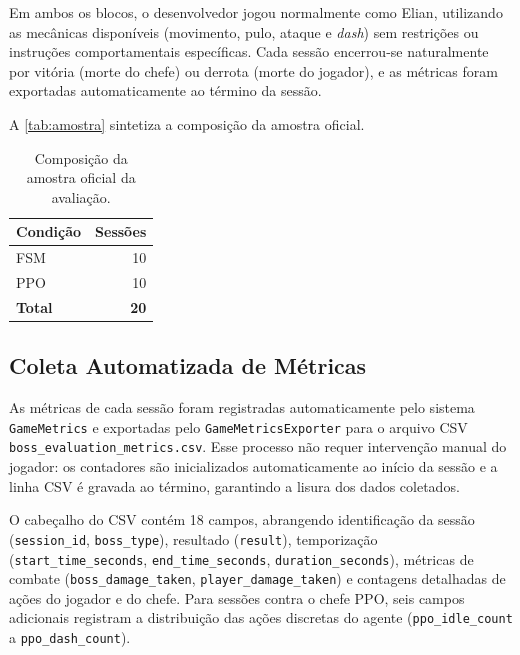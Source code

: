 Em ambos os blocos, o desenvolvedor jogou normalmente como Elian, utilizando
as mecânicas disponíveis (movimento, pulo, ataque e \textit{dash}) sem
restrições ou instruções comportamentais específicas. Cada sessão encerrou-se
naturalmente por vitória (morte do chefe) ou derrota (morte do jogador), e
as métricas foram exportadas automaticamente ao término da sessão.

A \autoref{tab:amostra} sintetiza a composição da amostra oficial.

\begin{table}[htb]
    \centering
    \caption{Composição da amostra oficial da avaliação.}
    \label{tab:amostra}
    \begin{tabular}{l r}
        \toprule
        \textbf{Condição} & \textbf{Sessões} \\
        \midrule
        FSM                & 10 \\
        PPO                & 10 \\
        \midrule
        \textbf{Total}     & \textbf{20} \\
        \bottomrule
    \end{tabular}
\end{table}

\subsection{Coleta Automatizada de Métricas}
\label{subsec:coleta-automatizada}

As métricas de cada sessão foram registradas automaticamente pelo sistema
\texttt{GameMetrics} e exportadas pelo \texttt{GameMetricsExporter} para o
arquivo CSV \texttt{boss\_evaluation\_metrics.csv}. Esse processo não requer
intervenção manual do jogador: os contadores são inicializados
automaticamente ao início da sessão e a linha CSV é gravada ao término,
garantindo a lisura dos dados coletados.

O cabeçalho do CSV contém 18 campos, abrangendo identificação da sessão
(\texttt{session\_id}, \texttt{boss\_type}), resultado
(\texttt{result}), temporização (\texttt{start\_time\_seconds},
\texttt{end\_time\_seconds}, \texttt{duration\_seconds}), métricas de
combate (\texttt{boss\_damage\_taken}, \texttt{player\_damage\_taken}) e
contagens detalhadas de ações do jogador e do chefe. Para sessões contra o
chefe PPO, seis campos adicionais registram a distribuição das ações
discretas do agente (\texttt{ppo\_idle\_count} a \texttt{ppo\_dash\_count}).

